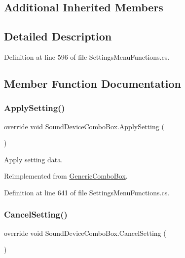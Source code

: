 \subsection*{Additional Inherited Members}


\subsection{Detailed Description}


Definition at line 596 of file Settings\+Menu\+Functions.\+cs.



\subsection{Member Function Documentation}
\mbox{\label{class_sound_device_combo_box_a93dba6ff0e9ebd8767b9e15551231747}} 
\subsubsection{\texorpdfstring{Apply\+Setting()}{ApplySetting()}}
{\footnotesize\ttfamily override void Sound\+Device\+Combo\+Box.\+Apply\+Setting (\begin{DoxyParamCaption}{ }\end{DoxyParamCaption})\hspace{0.3cm}{\ttfamily [virtual]}}



Apply setting data. 



Reimplemented from \hyperlink{class_generic_combo_box_a5aced71f035bd463a4ebaaffe19ec547}{Generic\+Combo\+Box}.



Definition at line 641 of file Settings\+Menu\+Functions.\+cs.

\mbox{\label{class_sound_device_combo_box_af557c68898898b0a6b490b72f56ff082}} 
\subsubsection{\texorpdfstring{Cancel\+Setting()}{CancelSetting()}}
{\footnotesize\ttfamily override void Sound\+Device\+Combo\+Box.\+Cancel\+Setting (\begin{DoxyParamCaption}{ }\end{DoxyParamCaption})\hspace{0.3cm}{\ttfamily [virtual]}}



